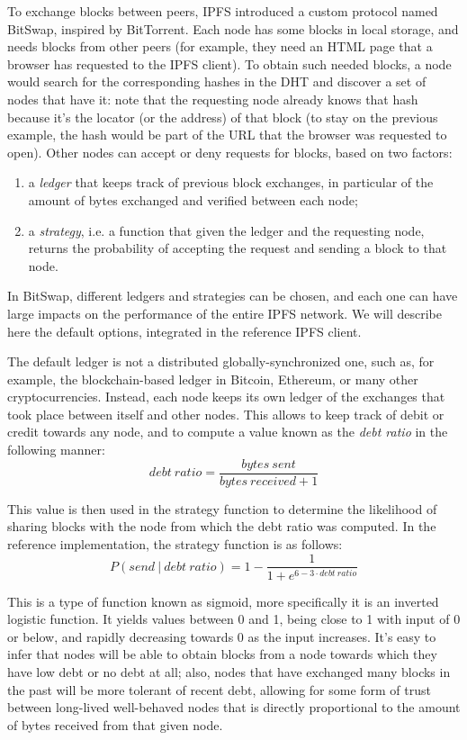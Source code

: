 \documentclass[mscthesis]{usiinfthesis}
\begin{document}
To exchange blocks between peers, IPFS introduced a custom protocol named BitSwap, inspired by BitTorrent. Each node has some blocks in local storage, and needs blocks from other peers (for example, they need an HTML page that a browser has requested to the IPFS client). To obtain such needed blocks, a node would search for the corresponding hashes in the DHT and discover a set of nodes that have it: note that the requesting node already knows that hash because it's the locator (or the address) of that block (to stay on the previous example, the hash would be part of the URL that the browser was requested to open). Other nodes can accept or deny requests for blocks, based on two factors:
\begin{enumerate}
	\item a \emph{ledger} that keeps track of previous block exchanges, in particular of the amount of bytes exchanged and verified between each node;
	\item a \emph{strategy}, i.e. a function that given the ledger and the requesting node, returns the probability of accepting the request and sending a block to that node.
\end{enumerate}
In BitSwap, different ledgers and strategies can be chosen, and each one can have large impacts on the performance of the entire IPFS network. We will describe here the default options, integrated in the reference IPFS client.

The default ledger is not a distributed globally-synchronized one, such as, for example, the blockchain-based ledger in Bitcoin, Ethereum, or many other cryptocurrencies. Instead, each node keeps its own ledger of the exchanges that took place between itself and other nodes. This allows to keep track of debit or credit towards any node, and to compute a value known as the \textit{debt ratio} in the following manner:
$$ \mathit{debt~ratio} = \frac{\mathit{bytes~sent}}{\mathit{bytes~received} + 1} $$

This value is then used in the strategy function to determine the likelihood of sharing blocks with the node from which the debt ratio was computed. In the reference implementation, the strategy function is as follows:
$$ P\left( \mathit{send}~|~\mathit{debt~ratio} \right) = 1 - \frac{1}{1 + e^{6 - 3\cdot\mathit{debt~ratio}}} $$

This is a type of function known as sigmoid, more specifically it is an inverted logistic function. It yields values between 0 and 1, being close to 1 with input of 0 or below, and rapidly decreasing towards 0 as the input increases. %
It's easy to infer that nodes will be able to obtain blocks from a node towards which they have low debt or no debt at all; also, nodes that have exchanged many blocks in the past will be more tolerant of recent debt, allowing for some form of trust between long-lived well-behaved nodes that is directly proportional to the amount of bytes received from that given node.
\end{document}

